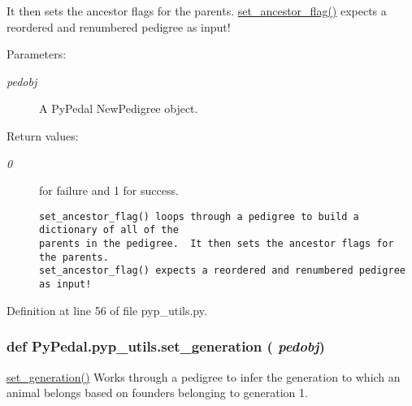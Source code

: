 It then sets the ancestor flags for the parents. \hyperlink{namespacePyPedal_1_1pyp__utils_fa9c95bf96313a8a0c9d5b2dfd9bd0a5}{set\_\-ancestor\_\-flag()} expects a reordered and renumbered pedigree as input! \begin{Desc}
\item[Parameters:]
\begin{description}
\item[{\em pedobj}]A Py\-Pedal New\-Pedigree object. \end{description}
\end{Desc}
\begin{Desc}
\item[Return values:]
\begin{description}
\item[{\em 0}]for failure and 1 for success.

\footnotesize\begin{verbatim}set_ancestor_flag() loops through a pedigree to build a dictionary of all of the
parents in the pedigree.  It then sets the ancestor flags for the parents.
set_ancestor_flag() expects a reordered and renumbered pedigree as input!
\end{verbatim}
\normalsize
 \end{description}
\end{Desc}


Definition at line 56 of file pyp\_\-utils.py.\hypertarget{namespacePyPedal_1_1pyp__utils_b5ebcd78052921a2dfbf5c5f088dd95e}{
\subsubsection[set\_\-generation]{\setlength{\rightskip}{0pt plus 5cm}def Py\-Pedal.pyp\_\-utils.set\_\-generation ( {\em pedobj})}}
\label{namespacePyPedal_1_1pyp__utils_b5ebcd78052921a2dfbf5c5f088dd95e}


\hyperlink{namespacePyPedal_1_1pyp__utils_b5ebcd78052921a2dfbf5c5f088dd95e}{set\_\-generation()} Works through a pedigree to infer the generation to which an animal belongs based on founders belonging to generation 1. 

